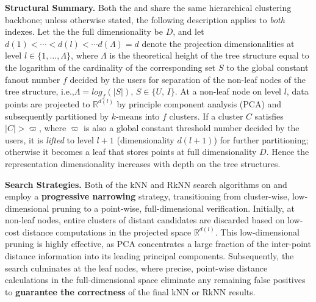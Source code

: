 \noindent \textbf{Structural Summary.}
Both the \deltatree and \hdrtree
 share the same hierarchical clustering backbone; unless otherwise stated, the following description applies to \emph{both} indexes.
Let the the full dimensionality be $D$, and let $d(1) < \cdots < d(l)< \cdots d(\Lambda) = d$ denote the projection dimensionalities at level $l \in \{1,\dots,\Lambda\}$, where $\Lambda$ is the theoretical height of the tree structure equal to the logarithm of the cardinality of the corresponding set $S$ to the global constant fanout number $f$ decided by the users for separation of the non-leaf nodes of the tree structure, i.e.,$\Lambda=log_{f}(|S|), \, S\in\{U,\,I\}$.
At a non-leaf node on level $l$, data points are projected to $\mathbb{R}^{d(l)}$ by principle component analysis (PCA) and subsequently partitioned by $k$-means into $f$ clusters. 
If a cluster $C$ satisfies $|C|>\varpi$, where $\varpi$ is also a global constant threshold number decided by the users, it is \emph{lifted} to level $l+1$ (dimensionality $d(l+1)$) for further partitioning; otherwise it becomes a leaf that stores points at full dimensionality $D$. 
Hence the representation dimensionality increases with depth on the tree structures.

\noindent \textbf{Search Strategies. }
Both of the kNN and RkNN search algorithms on \deltatree and \hdrtree employ a \textbf{progressive narrowing} strategy, transitioning from cluster-wise, low-dimensional pruning to a point-wise, full-dimensional verification. Initially, at non-leaf nodes, entire clusters of distant candidates are discarded based on low-cost distance computations in the projected space $\mathbb{R}^{d(l)}$.  This low-dimensional pruning is highly effective, as PCA concentrates a large fraction of the inter-point distance information into its leading principal components. Subsequently, the search culminates at the leaf nodes, where precise, point-wise distance calculations in the full-dimensional space eliminate any remaining false positives to \textbf{guarantee the correctness} of the final kNN or RkNN results.

